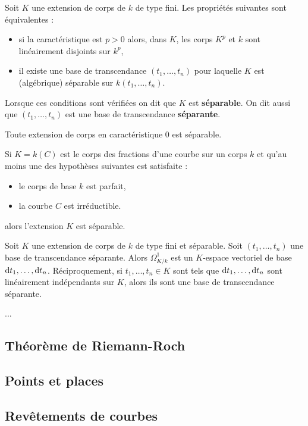 	\begin{pop}
		Soit $K$ une extension de corps de $k$ de type fini.
		Les propriétés suivantes sont équivalentes :
		\begin{itemize}
			\item[\textbullet] si la caractéristique est $p > 0$ alors, dans $K$, les corps $K^p$ et $k$ sont linéairement disjoints sur $k^p$,
			\item[\textbullet] il existe une base de transcendance $(t_1,\ldots,t_n)$ pour laquelle $K$ est (algébrique) séparable sur $k(t_1,\ldots,t_n)$.
		\end{itemize}
		Lorsque ces conditions sont vérifiées on dit que $K$ est \textbf{séparable}.
		On dit aussi que $(t_1,\ldots,t_n)$ est une base de transcendance \textbf{séparante}.
	\end{pop}
	
	\begin{rem}
		Toute extension de corps en caractéristique $0$ est séparable.
	\end{rem}
	
	\begin{pop}
		Si $K = k(C)$ est le corps des fractions d'une courbe sur un corps $k$ et qu'au moins une des hypothèses suivantes est satisfaite :
		\begin{itemize}
			\item[\textbullet] le corps de base $k$ est parfait,
			\item[\textbullet] la courbe $C$ est irréductible.
		\end{itemize}
		alors l'extension $K$ est séparable.
	\end{pop}

	\begin{pop}
		Soit $K$ une extension de corps de $k$ de type fini et séparable.
		Soit $(t_1,\ldots,t_n)$ une base de transcendance séparante.
		Alors $\Omega_{K/k}^1$ est un $K$-espace vectoriel de base $\mathop{}\mathopen{}\mathrm{d} t_1,\ldots,\mathop{}\mathopen{}\mathrm{d} t_n$.
		Réciproquement, si $t_1,\ldots,t_n \in K$ sont tels que $\mathop{}\mathopen{}\mathrm{d} t_1,\ldots,\mathop{}\mathopen{}\mathrm{d} t_n$ sont linéairement indépendants sur $K$, alors ils sont une base de transcendance séparante.
	\end{pop}
	
	...

\subsection{Théorème de Riemann-Roch}

	


\subsection{Points et places}

	


\subsection{Revêtements de courbes}

	